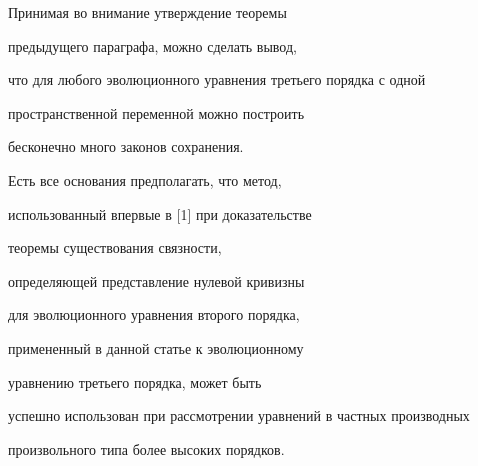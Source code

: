 \begin{notenonum}


Принимая во внимание утверждение теоремы 


предыдущего параграфа, можно сделать вывод,


что для любого эволюционного уравнения третьего порядка с одной


пространственной переменной можно построить 


бесконечно много законов сохранения.


\end{notenonum}





Есть все основания предполагать, что метод, 


использованный впервые в [1] при доказательстве 


теоремы существования связности,


определяющей представление нулевой кривизны 


для эволюционного уравнения второго порядка,


примененный в данной статье к эволюционному 


уравнению третьего порядка, может быть


успешно использован при рассмотрении уравнений в частных производных


произвольного типа более высоких порядков.





